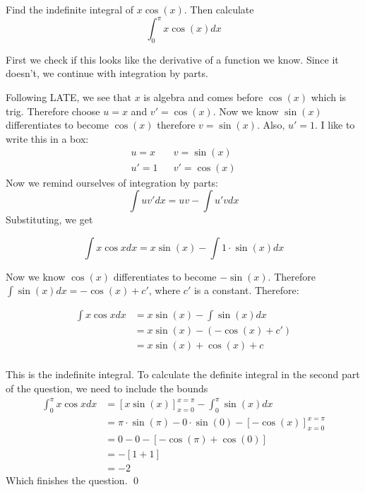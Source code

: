 \begin{example}
    Find the indefinite integral of $x\cos(x)$. Then calculate 
    \[ \int_{0}^{\pi}x\cos(x) dx\]
\end{example}
\begin{solution}
    First we check if this looks like the derivative of a function we know. Since it doesn't, we continue with integration by parts.

    Following LATE, we see that $x$ is algebra and comes before $\cos(x)$ which is trig. Therefore choose $u=x$ and $v' = \cos(x)$.
    Now we know $\sin(x)$ differentiates to become $\cos(x)$ therefore $v = \sin(x)$. Also, $u' = 1$. I like to write this in a box:
    \begin{align*}
        u = x & & v = \sin(x) \\
        u' = 1 & & v' = \cos(x)
    \end{align*}
    Now we remind ourselves of integration by parts:
    \[ \int u v' dx = uv - \int u' v dx \]
    Substituting, we get 

    \[ \int x \cos x dx = x \sin(x) - \int 1 \cdot \sin(x) dx \]

    Now we know $\cos(x)$ differentiates to become $-\sin(x)$. Therefore $\int \sin(x) dx = -\cos(x) + c'$, where $c'$ is a constant. Therefore:

    \begin{align*}
        \int x \cos x dx &= x \sin(x) - \int \sin(x) dx \\
            &= x \sin(x) - (-\cos(x) + c') \\
            &= x \sin(x) + \cos(x) + c \tag{letting $c = -c'$}\\
    \end{align*}

    This is the indefinite integral. To calculate the definite integral in the second part of the question, we need to include the bounds
    \begin{align*}
        \int_0^\pi x \cos x dx &= [x \sin(x)]_{x=0}^{x=\pi} - \int_0^\pi \sin(x) dx \\
            &= \pi \cdot \sin(\pi) - 0 \cdot \sin(0) - [-\cos(x)]_{x=0}^{x=\pi} \\
            &= 0 - 0 - [-\cos(\pi) + \cos(0)] \tag{$\sin(\pi) = 0$}\\
            &=  -[1+1]\\
            &= -2
    \end{align*}
    Which finishes the question.
    \qed
\end{solution}

